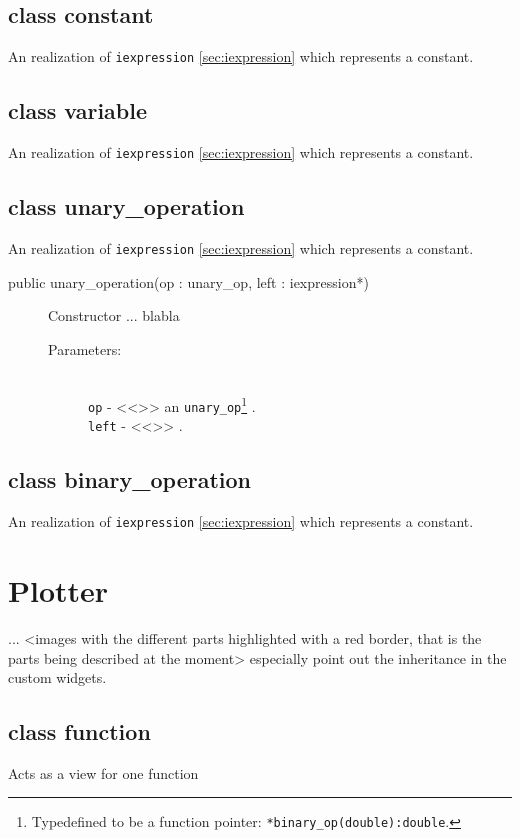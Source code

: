 \documentclass[a4paper,11pt]{kth-mag}
\begin{document}
\subsection{class constant} An realization of \texttt{iexpression}
\ref{sec:iexpression} which represents a constant. 
\subsection{class variable} An realization of \texttt{iexpression}
\ref{sec:iexpression} which represents a constant. 

\subsection{class unary\_operation} An realization of \texttt{iexpression}
\ref{sec:iexpression} which represents a constant. 

\begin{description}
    \item[public unary\_operation(op : unary\_op, left : iexpression*)] Constructor ...
    blabla 
    \begin{description}
            \item[Parameters:]~\\
                \verb+op+ - <<>> an \texttt{unary\_op}\footnote{Typedefined to
                be a function pointer: \texttt{*binary\_op(double):double}.} .\\
                \verb+left+ - <<>> .
        \end{description}
\end{description}

\subsection{class binary\_operation} An realization of \texttt{iexpression}
\ref{sec:iexpression} which represents a constant. 

\section{Plotter}
...
<images with the different parts highlighted with a red border, that is the parts being described at the moment>
especially point out the inheritance in the custom widgets.


\subsection{class function}
Acts as a view for one function
\end{document}
